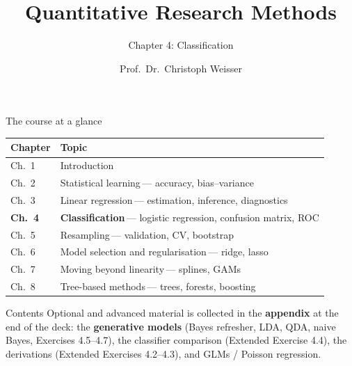 \documentclass[aspectratio=169,11pt]{beamer}
\title{Quantitative Research Methods}
\subtitle{Chapter 4: Classification}
\author{Prof.\ Dr.\ Christoph Weisser}
\date{}\graphicspath{{images/}}
\begin{document}
\begin{frame}[plain]\titlepage\end{frame}

\begin{frame}{The course at a glance}
  \vspace{-1.5mm}
  \begin{center}
  \scriptsize
  \setlength{\tabcolsep}{5pt}
  \renewcommand{\arraystretch}{1.30}
  \begin{tabular}{@{\hspace{2pt}}l >{\raggedright\arraybackslash}p{}@{\hspace{2pt}}}
    \toprule
    \textbf{Chapter} & \textbf{Topic} \\
    \midrule
     {\color{accent}Ch.\ 1} & Introduction \\
    \rowcolor{black!3} {\color{accent}Ch.\ 2} & Statistical learning\,{\color{black!45}--- accuracy, bias--variance} \\
     {\color{accent}Ch.\ 3} & Linear regression\,{\color{black!45}--- estimation, inference, diagnostics} \\
    \rowcolor{accent!18} \textbf{Ch.\ 4} & \textbf{Classification}\,{\color{accent!75!black}--- logistic regression, confusion matrix, ROC} \\
     {\color{accent}Ch.\ 5} & Resampling\,{\color{black!45}--- validation, CV, bootstrap} \\
    \rowcolor{black!3} {\color{accent}Ch.\ 6} & Model selection and regularisation\,{\color{black!45}--- ridge, lasso} \\
     {\color{accent}Ch.\ 7} & Moving beyond linearity\,{\color{black!45}--- splines, GAMs} \\
    \rowcolor{black!3} {\color{accent}Ch.\ 8} & Tree-based methods\,{\color{black!45}--- trees, forests, boosting} \\
    \bottomrule
  \end{tabular}
  \end{center}
\end{frame}


\begin{frame}{Contents}\small
  \tableofcontents[hideallsubsections]
  \vfill
  {\tiny Optional and advanced material is collected in the \textbf{appendix} at the end of the
  deck: the \textbf{generative models} (Bayes refresher, LDA, QDA, naive Bayes, Exercises
  4.5--4.7), the classifier comparison (Extended Exercise 4.4), the derivations
  (Extended Exercises 4.2--4.3), and GLMs / Poisson regression.}
\end{frame}
\end{document}
